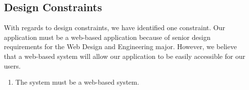 \subsection{Design Constraints}
With regards to design constraints, we have identified one constraint. Our application must be a web-based application because of senior design requirements for the Web Design and Engineering major. However, we believe that a web-based system will allow our application to be easily accessible for our users. 
\begin{enumerate}
\item The system must be a web-based system.
\end{enumerate}
